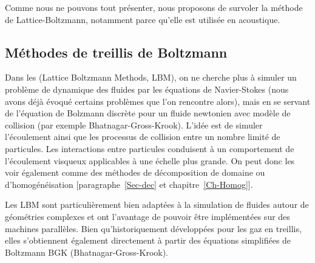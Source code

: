 \medskip
Comme nous ne pouvons tout présenter, nous proposons de survoler la méthode de Lattice-Boltzmann, notamment parce qu'elle est utilisée en acoustique.

\medskip
\subsection{Méthodes de treillis de Boltzmann}
Dans les  (Lattice Boltzmann Methods, LBM), on ne cherche plus à simuler un problème de dynamique des fluides par les équations de Navier-Stokes (nous avons déjà évoqué certains problèmes que l'on rencontre alors), mais en se servant de l'équation de Bolzmann discrète pour un fluide newtonien avec modèle de collision (par exemple Bhatnagar-Gross-Krook). L'idée est de simuler l'écoulement ainsi que les processus de collision entre un nombre limité de particules. Les interactions entre particules conduisent à un comportement de l'écoulement visqueux applicables à une échelle plus grande. On peut donc les voir également comme des méthodes de décomposition de domaine ou d'homogénéisation [paragraphe~\ref{Sec-dec} et chapitre~\ref{Ch-Homog}].

\medskip
Les LBM sont particulièrement bien adaptées à la simulation de fluides autour de géométries complexes et ont l'avantage de pouvoir être implémentées sur des machines parallèles. Bien qu'historiquement développées pour les gaz en treillis, elles s'obtiennent également directement à partir des équations simplifiées de Boltzmann BGK (Bhatnagar-Gross-Krook).

